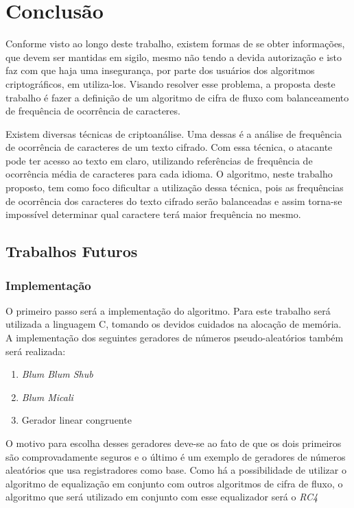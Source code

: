 \chapter{Conclusão}
\label{conclusion}


Conforme visto ao longo deste trabalho, existem formas de se obter informações, que devem ser mantidas em sigilo, mesmo não tendo a devida autorização e isto faz com que haja uma insegurança, por parte dos usuários dos algoritmos criptográficos, em utiliza-los. Visando resolver esse problema, a proposta deste trabalho é fazer a definição de um algoritmo de cifra de fluxo com balanceamento de frequência de ocorrência de caracteres.

Existem diversas técnicas de criptoanálise. Uma dessas é a análise de frequência de ocorrência de caracteres de um texto cifrado. Com essa técnica, o atacante pode ter acesso ao texto em claro, utilizando referências de frequência de ocorrência média de caracteres para cada idioma. O algoritmo, neste trabalho proposto, tem como foco dificultar a utilização dessa técnica, pois as frequências de ocorrência dos caracteres do texto cifrado serão balanceadas e assim torna-se impossível determinar qual caractere terá maior frequência no mesmo.

\section{Trabalhos Futuros}
\label{future-work}

	\subsection{Implementação}
	\label{implementation}
	
	O primeiro passo será a implementação do algoritmo. Para este trabalho será utilizada a linguagem C, tomando os devidos cuidados na alocação de memória. 
	A implementação dos seguintes geradores de números pseudo-aleatórios também será realizada:
		\begin{enumerate}
			\item \textit{Blum Blum Shub}
			\item \textit{Blum Micali}
			\item Gerador linear congruente 
		\end{enumerate}		 
	O motivo para escolha desses geradores deve-se ao fato de que os dois primeiros são comprovadamente seguros e o último é um exemplo de geradores de números aleatórios que usa registradores como base. 
	Como há a possibilidade de utilizar o algoritmo de equalização em conjunto com outros algoritmos de cifra de fluxo, o algoritmo que será utilizado em conjunto com esse equalizador será o \textit{RC4}
	
